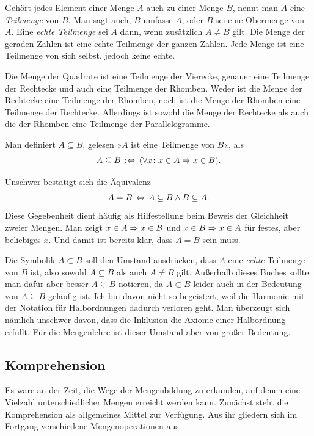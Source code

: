 Gehört jedes Element einer Menge $A$ auch zu einer Menge $B$, nennt
man $A$ eine \emph{Teilmenge} von $B$. Man sagt auch,
$B$ umfasse $A$, oder $B$ sei eine Obermenge von $A$. Eine \emph{echte
Teilmenge} sei $A$ dann, wenn zusätzlich $A\ne B$ gilt. Die Menge der
geraden Zahlen ist eine echte Teilmenge der ganzen Zahlen. Jede Menge
ist eine Teilmenge von sich selbst, jedoch keine echte.

Die Menge der Quadrate ist eine Teilmenge der Vierecke, genauer eine
Teilmenge der Rechtecke und auch eine Teilmenge der Rhomben.
Weder ist die Menge der Rechtecke eine Teilmenge der Rhomben, noch
ist die Menge der Rhomben eine Teilmenge der Rechtecke.
Allerdings ist sowohl die Menge der Rechtecke als auch die der Rhomben
eine Teilmenge der Parallelogramme.

\begin{Definition}[Inklusion]%
\label{def:Teilmenge}\newlinefirst
Man definiert $A\subseteq B$, gelesen »$A$ ist eine Teilmenge von $B$«, als
\[A\subseteq B\,:\Leftrightarrow\, (\forall x\colon x\in A\Rightarrow x\in B).\]
\end{Definition}
Unschwer bestätigt sich die Äquivalenz
\[A = B\,\Leftrightarrow\, A\subseteq B\land B\subseteq A.\]
Diese Gegebenheit dient häufig als Hilfestellung beim Beweis der
Gleichheit zweier Mengen. Man zeigt $x\in A\Rightarrow x\in B$ und
$x\in B\Rightarrow x\in A$ für festes, aber beliebiges $x$. Und damit ist
bereits klar, dass $A = B$ sein muss.

Die Symbolik $A\subset B$ soll den Umstand ausdrücken, dass $A$ eine
\emph{echte} Teilmenge von $B$ ist, also sowohl $A\subseteq B$
als auch $A\ne B$ gilt. Außerhalb dieses Buches sollte man dafür
aber besser $A\subsetneq B$ notieren, da $A\subset B$ leider auch
in der Bedeutung von $A\subseteq B$ geläufig ist. Ich bin davon
nicht so begeistert, weil die Harmonie mit der Notation für
Halbordnungen dadurch verloren geht. Man überzeugt sich nämlich unschwer
davon, dass die Inklusion die Axiome einer Halbordnung erfüllt. Für die
Mengenlehre ist dieser Umstand aber von großer Bedeutung.

\subsection{Komprehension}

Es wäre an der Zeit, die Wege der Mengenbildung zu erkunden, auf denen
eine Vielzahl unterschiedlicher Mengen erreicht werden kann. Zunächst
steht die Komprehension als allgemeines Mittel zur Verfügung. Aus ihr
gliedern sich im Fortgang verschiedene Mengenoperationen aus.

